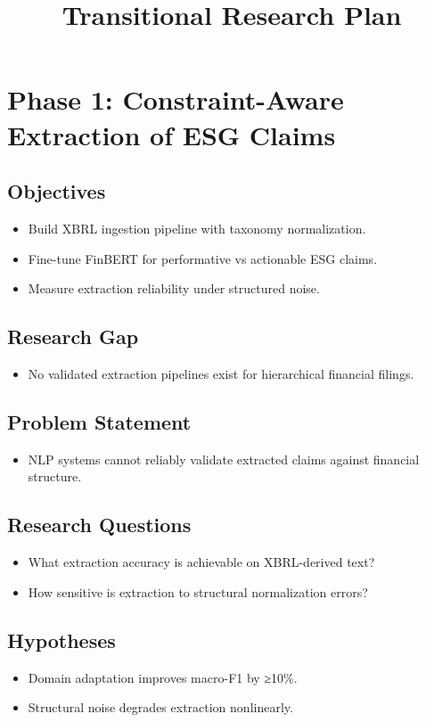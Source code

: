 \documentclass{article}
\title{Transitional Research Plan}
\date{}
\begin{document}
\maketitle
\section{Phase 1: Constraint-Aware Extraction of ESG Claims}
\subsection{Objectives}
\begin{itemize}
  \item Build XBRL ingestion pipeline with taxonomy normalization.
  \item Fine-tune FinBERT for performative vs actionable ESG claims.
  \item Measure extraction reliability under structured noise.
\end{itemize}
\subsection{Research Gap}
\begin{itemize}
  \item No validated extraction pipelines exist for hierarchical financial filings.
\end{itemize}
\subsection{Problem Statement}
\begin{itemize}
  \item NLP systems cannot reliably validate extracted claims against financial structure.
\end{itemize}
\subsection{Research Questions}
\begin{itemize}
  \item What extraction accuracy is achievable on XBRL-derived text?
  \item How sensitive is extraction to structural normalization errors?
\end{itemize}
\subsection{Hypotheses}
\begin{itemize}
  \item Domain adaptation improves macro-F1 by ≥10\%.
  \item Structural noise degrades extraction nonlinearly.
\end{itemize}
\end{document}
